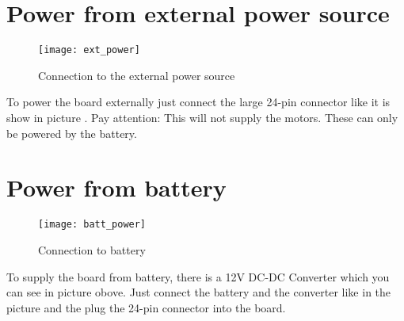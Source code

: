 \newpage

\section{Power from external power source}
\label{setup_external}

\begin{figure}[h]
	\centering
		\texttt{[image: ext\_power]}
	\caption{Connection to the external power source}
	\label{fig:ext_power}
\end{figure}
To power the board externally just connect the large 24-pin connector like it is show in picture . Pay attention: This will not supply the motors. These can only be powered by the battery.

\section{Power from battery}
\label{setup_battery}

\begin{figure}[h]
	\centering
		\texttt{[image: batt\_power]}
	\caption{Connection to battery}
	\label{fig:batt_power}
\end{figure}
To supply the board from battery, there is a 12V DC-DC Converter which you can see in picture  obove. Just connect the battery and the converter like in the picture and the plug the 24-pin connector into the board.




